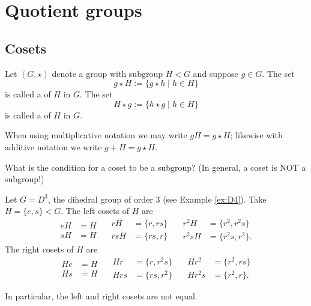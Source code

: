 \documentclass[../algebraNotesMSRI-UP2016.tex]{subfiles}
\begin{document}
\section[\S \thesection]{Quotient groups}\label{sec:2p7quotientGroups}
\subsection[\subsecname]{Cosets}
\begin{frame}{\subsecname}
\begin{dfn}
Let $(G,\star)$ denote a group with subgroup $H< G$ and suppose $g\in G$.  The set
\[
g\star H:=\{g\star h\mid h\in H\}
\]
is called a  of $H$ in $G$.  The set
\[
H\star g:=\{h\star g\mid h\in H\}
\]  
is called a  of $H$ in $G$.
\end{dfn}
%
When using multiplicative notation we may write $gH=g\star H$; likewise with additive notation we write $g+H=g\star H$.

\begin{que}
What is the condition for a coset to be a subgroup?  (In general, a coset is NOT a subgroup!)
\end{que}
\end{frame}

\begin{frame}{}{}
\begin{ex}\label{ex:D3}
Let $G=D^3$, the dihedral group of order $3$ (see Example \ref{ex:D4}).  Take $H=\{e,s\}<G$.  The left cosets of $H$ are 
\[
\begin{aligned}
eH &= H \\
sH &= H
\end{aligned}
\quad
\begin{aligned}
rH &= \{r,rs \} \\
rsH &= \{rs, r\}
\end{aligned}
\quad
\begin{aligned}
r^2H &= \{r^2,r^2s\} \\
r^2sH &= \{r^2s, r^2\}.
\end{aligned}
\]
The right cosets of $H$ are
\[
\begin{aligned}
He &= H \\
Hs &= H
\end{aligned}
\quad
\begin{aligned}
Hr &= \{r, r^2s \} \\
Hrs &= \{rs, r^2\}
\end{aligned}
\quad
\begin{aligned}
Hr^2 &= \{r^2,rs\} \\
Hr^2s &= \{r^2,r\}.
\end{aligned}
\]
\end{ex}

\smallGap
In particular, the left and right cosets are not equal.
\end{frame}
\end{document}
